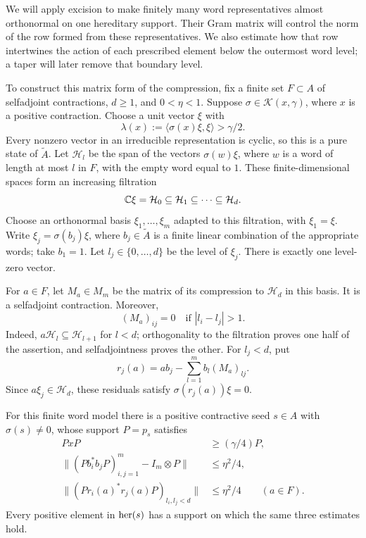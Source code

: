 We will apply excision to make finitely many word representatives
almost orthonormal on one hereditary support.  Their Gram matrix will
control the norm of the row formed from these representatives.  We
also estimate how that row intertwines the action of each prescribed
element below the outermost word level; a taper will later remove
that boundary level.

To construct this matrix form of the compression, fix a finite set
\(F\subset A\) of selfadjoint contractions, \(d\ge1\), and
\(0<\eta<1\).  Suppose \(\sigma\in\mathcal K(x,\gamma)\), where \(x\)
is a positive contraction.  Choose a unit vector \(\xi\) with
\[
 \lambda(x):=\langle\sigma(x)\xi,\xi\rangle>\gamma/2.
\]
Every nonzero vector in an irreducible representation is cyclic, so
this is a pure state of \(\widetilde A\).  Let \(\mathcal H_l\) be the
span of the vectors \(\sigma(w)\xi\), where \(w\) is a word of length
at most \(l\) in \(F\), with the empty word equal to \(1\).  These
finite-dimensional spaces form an increasing filtration
\[
 \mathbb C\xi=\mathcal H_0\subseteq\mathcal H_1
       \subseteq\cdots\subseteq\mathcal H_d.
\]
Choose an orthonormal basis \(\xi_1,\ldots,\xi_m\) adapted to this
filtration, with \(\xi_1=\xi\).  Write
\(\xi_j=\sigma(b_j)\xi\), where \(b_j\in\widetilde A\) is a finite
linear combination of the appropriate words; take \(b_1=1\).
Let \(l_j\in\{0,\ldots,d\}\) be the level of \(\xi_j\).  There is
exactly one level-zero vector.

For \(a\in F\), let \(M_a\in M_m\) be the matrix of its compression
to \(\mathcal H_d\) in this basis.  It is a selfadjoint contraction.
Moreover,
\begin{equation}\label{norm:banded-model}
 (M_a)_{ij}=0\quad\text{if }|l_i-l_j|>1.
\end{equation}
Indeed, \(a\mathcal H_l\subseteq\mathcal H_{l+1}\) for \(l<d\);
orthogonality to the filtration proves one half of the assertion,
and selfadjointness proves the other.  For \(l_j<d\), put
\[
 r_j(a)=ab_j-\sum_{l=1}^m b_l(M_a)_{lj}.
\]
Since \(a\xi_j\in\mathcal H_d\), these residuals satisfy
\(\sigma(r_j(a))\xi=0\).

\begin{lemma}\label{norm:prototype}
For this finite word model there is a positive contractive seed
\(s\in A\) with \(\sigma(s)\ne0\), whose support \(P=p_s\) satisfies
\begin{align}
 PxP&\ge(\gamma/4)P,                                      \label{norm:positive-compression}\\
 \big\|(Pb_i^*b_jP)_{i,j=1}^m-I_m\otimes P\big\|
      &\le\eta^2/4,                                     \label{norm:local-gram}\\
 \big\|(Pr_i(a)^*r_j(a)P)_{l_i,l_j<d}\big\|
      &\le\eta^2/4\qquad(a\in F).                        \label{norm:local-residual}
\end{align}
Every positive element in \(\operatorname{her}(s)\) has a support on which the
same three estimates hold.
\end{lemma}

